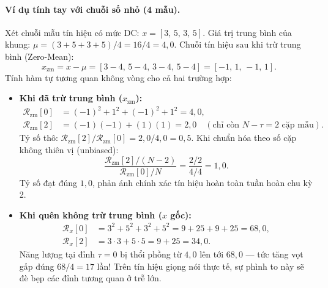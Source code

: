 \paragraph{Ví dụ tính tay với chuỗi số nhỏ (4 mẫu).}
Xét chuỗi mẫu tín hiệu có mức DC: $x = [3,\,5,\,3,\,5]$.
Giá trị trung bình của khung: $\mu = (3 + 5 + 3 + 5) / 4 = 16 / 4 = 4{,}0$.
Chuỗi tín hiệu sau khi trừ trung bình (Zero-Mean):
\[
x_{\mathrm{zm}} = x - \mu = [3-4,\, 5-4,\, 3-4,\, 5-4] = [-1,\, 1,\, -1,\, 1].
\]
Tính hàm tự tương quan không vòng cho cả hai trường hợp:
\begin{itemize}[leftmargin=1.4em]
    \item \textbf{Khi đã trừ trung bình ($x_{\mathrm{zm}}$):}
    \begin{align*}
    \mathcal{R}_{\mathrm{zm}}[0] &= (-1)^2 + 1^2 + (-1)^2 + 1^2 = 4{,}0,\\[4pt]
    \mathcal{R}_{\mathrm{zm}}[2] &= (-1)(-1) + (1)(1) = 2{,}0 \quad (\text{chỉ còn } N-\tau = 2 \text{ cặp mẫu}).
    \end{align*}
    Tỷ số thô: $\mathcal{R}_{\mathrm{zm}}[2] / \mathcal{R}_{\mathrm{zm}}[0] = 2{,}0 / 4{,}0 = 0{,}5$.
    Khi chuẩn hóa theo số cặp không thiên vị (unbiased):
    \[
    \frac{\mathcal{R}_{\mathrm{zm}}[2] / (N-2)}{\mathcal{R}_{\mathrm{zm}}[0] / N} = \frac{2 / 2}{4 / 4} = 1{,}0.
    \]
    Tỷ số đạt đúng $1{,}0$, phản ánh chính xác tín hiệu hoàn toàn tuần hoàn chu kỳ 2.
    \item \textbf{Khi quên không trừ trung bình ($x$ gốc):}
    \begin{align*}
    \mathcal{R}_x[0] &= 3^2 + 5^2 + 3^2 + 5^2 = 9 + 25 + 9 + 25 = 68{,}0,\\[4pt]
    \mathcal{R}_x[2] &= 3 \cdot 3 + 5 \cdot 5 = 9 + 25 = 34{,}0.
    \end{align*}
    Năng lượng tại đỉnh $\tau = 0$ bị thổi phồng từ $4{,}0$ lên tới $68{,}0$ --- tức tăng vọt gấp đúng $68 / 4 = 17$ lần! Trên tín hiệu giọng nói thực tế, sự phình to này sẽ đè bẹp các đỉnh tương quan ở trễ lớn.
\end{itemize}


